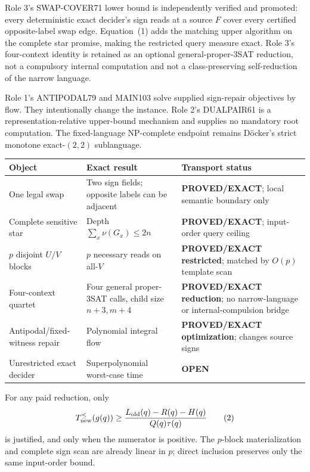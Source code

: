\documentclass[11pt]{article}
\newcommand{\OPEN}{\textbf{OPEN}}
\begin{document}
Role 3's SWAP-COVER71 lower bound is independently verified and promoted:
every deterministic exact decider's sign reads at a source $F$ cover every
certified opposite-label swap edge. Equation~(1) adds the matching upper
algorithm on the complete star promise, making the restricted query measure
exact. Role 3's four-context identity is retained as an optional
general-proper-3SAT reduction, not a compulsory internal computation and not
a class-preserving self-reduction of the narrow language.

Role 1's ANTIPODAL79 and MAIN103 solve supplied sign-repair objectives by
flow. They intentionally change the instance. Role 2's DUALPAIR61 is a
representation-relative upper-bound mechanism and supplies no mandatory
root computation. The fixed-language NP-complete endpoint remains D\"ocker's
strict monotone exact-$(2,2)$ sublanguage.

\begin{longtable}{@{}p{.23\linewidth}p{.31\linewidth}p{.37\linewidth}@{}}
\toprule
Object & Exact result & Transport status\\\midrule\endhead
One legal swap & Two sign fields; opposite labels can be adjacent &
\textbf{PROVED/EXACT}; local semantic boundary only\\
Complete sensitive star & Depth $\sum_x\nu(G_x)\le2n$ &
\textbf{PROVED/EXACT}; input-order query ceiling\\
$p$ disjoint $U/V$ blocks & $p$ necessary reads on all-$V$ &
\textbf{PROVED/EXACT restricted}; matched by $O(p)$ template scan\\
Four-context quartet & Four general proper-3SAT calls, child size
$n+3,m+4$ & \textbf{PROVED/EXACT reduction}; no narrow-language or
internal-compulsion bridge\\
Antipodal/fixed-witness repair & Polynomial integral flow &
\textbf{PROVED/EXACT optimization}; changes source signs\\
Unrestricted exact decider & Superpolynomial worst-case time &
\OPEN\\
\bottomrule
\end{longtable}

For any paid reduction, only
\[
T_{\rm new}^{\le}(g(q))\ge
\frac{L_{\rm old}(q)-R(q)-H(q)}{Q(q)\tau(q)}
\tag{2}
\]
is justified, and only when the numerator is positive. The $p$-block
materialization and complete sign scan are already linear in $p$; direct
inclusion preserves only the same input-order bound.
\end{document}
